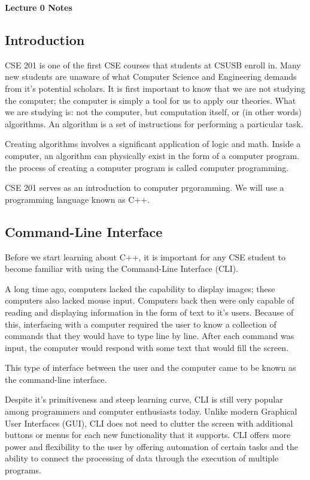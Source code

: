 \documentclass[a4paper,12pt]{article}
\begin{document}
\lstset{basicstyle=\ttfamily,tabsize=4}

{\centering \bf \Large
Lecture 0 Notes \\
}

\subsection*{Introduction}

CSE 201 is one of the first CSE courses that students at CSUSB enroll in. Many new students are unaware of what Computer Science and Engineering demands from it's potential scholars. It is first important to know that we are not studying the computer; the computer is simply a tool for us to apply our theories. What we are studying is: not the computer, but computation itself, or (in other words) algorithms. An algorithm is a set of instructions for performing a particular task.

Creating algorithms involves a significant application of logic and math. Inside a computer, an algorithm can physically exist in the form of a computer program. the process of creating a computer program is called computer programming.

CSE 201 serves as an introduction to computer prgoramming. We will use a programming language known as C++. 

\subsection*{Command-Line Interface}

Before we start learning about C++, it is important for any CSE student to become familiar with using the Command-Line Interface (CLI). 

A long time ago, computers lacked the capability to display images; these computers also lacked mouse input. Computers back then were only capable of reading and displaying information in the form of text to it's users. Because of this, interfacing with a computer required the user to know a collection of commands that they would have to type line by line. After each command was input, the computer would respond with some text that would fill the screen. 

This type of interface between the user and the computer came to be known as the command-line interface.

Despite it's primitiveness and steep learning curve, CLI is still very popular among programmers and computer enthusiasts today. Unlike modern Graphical User Interfaces (GUI), CLI does not need to clutter the screen with additional buttons or menus for each new functionality that it supports. CLI offers more power and flexibility to the user by offering automation of certain tasks and the ability to connect the processing of data through the execution of multiple programs.
\end{document}
